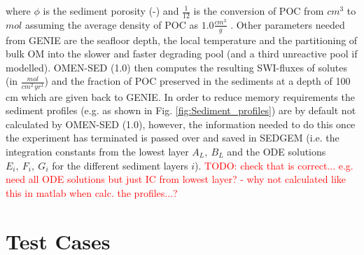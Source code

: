 \documentclass[gmd, manuscript]{copernicus}
\begin{document}
where $\phi$ is the sediment porosity (-) and $\frac{1}{12}$ is the conversion of POC from $cm^3$ to $mol$ assuming the average density of POC as $1.0 \frac{cm^3}{g}$ .
Other parameters needed from GENIE are the seafloor depth, the local temperature and the partitioning of bulk OM into the slower and faster degrading pool (and a third unreactive pool if modelled). 
OMEN-SED (1.0) then computes the resulting SWI-fluxes of solutes (in $\frac{mol}{cm^2\,yr^1}$) and the fraction of POC preserved in the sediments at a depth of 100 cm which are given back to GENIE. 
In order to reduce memory requirements the sediment profiles (e.g. as shown in Fig. \ref{fig:Sediment_profiles}) are by default not calculated by OMEN-SED (1.0), however, the information needed to do this once the experiment 
has terminated is passed over and saved in SEDGEM (i.e. the integration constants from the lowest layer $A_L,\ B_L$ and the ODE solutions $E_i,\ F_i,\ G_i$ for the different sediment layers $i$).
\textcolor{red}{TODO: check that is correct... e.g. need all ODE solutions but just IC from lowest layer? - why not calculated like this in matlab when calc. the profiles...?}



\section {Test Cases}
\end{document}

